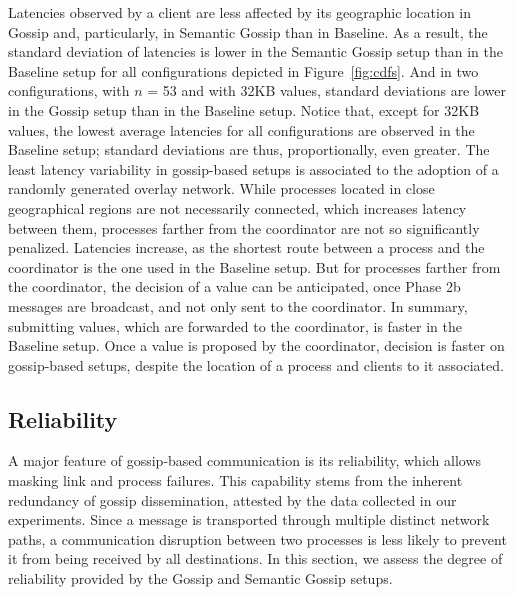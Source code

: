
Latencies observed by a client are less affected by its geographic location in
Gossip and, particularly, in Semantic Gossip than in Baseline.
As a result, the standard deviation of latencies is lower in the Semantic Gossip
setup than in the Baseline setup for all configurations depicted in
Figure~\ref{fig:cdfs}.
And in two configurations, with $n$ = 53 and with 32KB values, standard
deviations are lower in the Gossip setup than in the Baseline setup.
Notice that, except for 32KB values, the lowest average latencies for all
configurations are observed in the Baseline setup; standard deviations are thus,
proportionally, even greater.
%
The least latency variability in gossip-based setups is associated to the
adoption of a randomly generated overlay network.
While processes located in close geographical regions are not necessarily
connected, which increases latency between them, processes farther from the
coordinator are not so significantly penalized.
%
Latencies increase, as the shortest route between a process and the coordinator
is the one used in the Baseline setup.
But for processes farther from the coordinator, the decision of a value can be
anticipated, once Phase 2b messages are broadcast, and not only sent to the
coordinator.
%
In summary, submitting values, which are forwarded to the coordinator, is
faster in the Baseline setup.
Once a value is proposed by the coordinator, decision is faster on gossip-based
setups, despite the location of a process and clients to it associated.

\subsection{Reliability}

A major feature of gossip-based communication is its reliability, which allows
masking link and process failures.
This capability stems from the inherent redundancy of gossip dissemination,
attested by the data collected in our experiments.
Since a message is transported through multiple distinct network paths, a
communication disruption between two processes is less likely to prevent it
from being received by all destinations.
%
In this section, we assess the degree of reliability provided by the Gossip and
Semantic Gossip setups.

